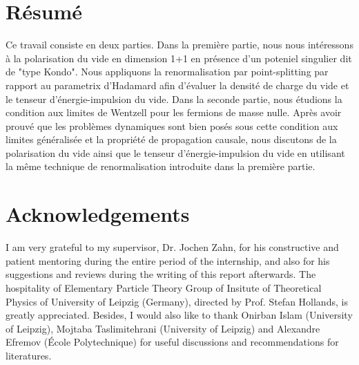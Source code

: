 \section*{Résumé}
Ce travail consiste en deux parties. 
Dans la première partie, nous nous intéressons à la polarisation du vide en dimension 1+1 en présence d'un poteniel singulier dit de "type Kondo".
Nous appliquons la renormalisation par point-splitting par rapport au parametrix d'Hadamard afin d'évaluer la densité de charge du vide et le tenseur d'énergie-impulsion du vide.
Dans la seconde partie, nous étudions la condition aux limites de Wentzell pour les fermions de masse nulle.
Après avoir prouvé que les problèmes dynamiques sont bien posés sous cette condition aux limites généralisée et la propriété de propagation causale,
nous discutons de la polarisation du vide ainsi que le tenseur d'énergie-impulsion du vide en utilisant la même technique de renormalisation introduite dans la première partie.

\newpage
\section*{Acknowledgements}
I am very grateful to my supervisor, Dr. Jochen Zahn, for his constructive and patient mentoring during the entire period of the internship, and also for his suggestions and reviews during the writing of this report afterwards.
The hospitality of Elementary Particle Theory Group of Insitute of Theoretical Physics of University of Leipzig (Germany), directed by Prof. Stefan Hollands, is greatly appreciated.
Besides, I would also like to thank Onirban Islam (University of Leipzig), Mojtaba Taslimitehrani (University of Leipzig) and Alexandre Efremov (École Polytechnique) for useful discussions and recommendations for literatures. 
